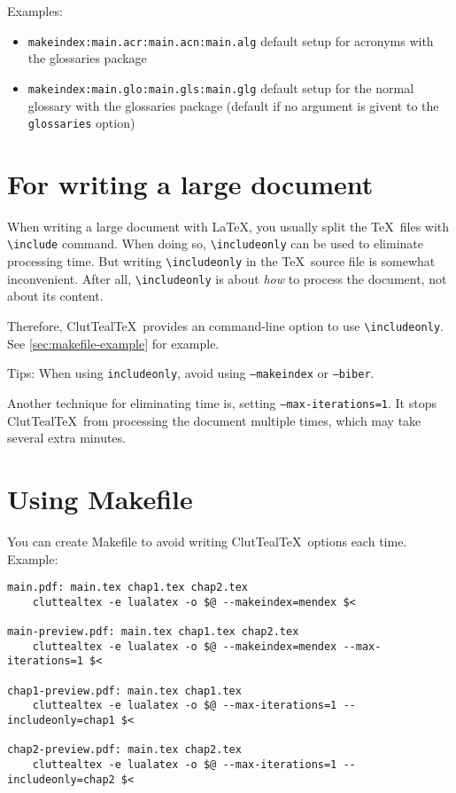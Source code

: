 \documentclass[a4paper]{report}
\newcommand\CluttealTeX{ClutTeal\TeX\xspace}
\newcommand\texcmd[1]{\texttt{\textbackslash #1}}
\begin{document}
Examples:
\begin{itemize}
	\item  \texttt{makeindex:main.acr:main.acn:main.alg}
		\newline
		default setup for
		acronyms with the glossaries package
	\item \texttt{makeindex:main.glo:main.gls:main.glg}
		\newline
		default setup for the
		normal glossary with the glossaries package
		\newline
		(default if no argument is givent to the \texttt{glossaries} option)
\end{itemize}

\section{For writing a large document}
When writing a large document with \LaTeX, you usually split the \TeX\ files with \texcmd{include} command.
When doing so, \texcmd{includeonly} can be used to eliminate processing time.
But writing \texcmd{includeonly} in the \TeX\ source file is somewhat inconvenient.
After all, \texcmd{includeonly} is about \emph{how} to process the document, not about its content.

Therefore, \CluttealTeX\ provides an command-line option to use \texcmd{includeonly}.
See \autoref{sec:makefile-example} for example.

Tips: When using \texttt{includeonly}, avoid using \texttt{--makeindex} or \texttt{--biber}.

Another technique for eliminating time is, setting \texttt{--max-iterations=1}.
It stops \CluttealTeX\ from processing the document multiple times, which may take several extra minutes.

\section{Using Makefile}\label{sec:makefile-example}
You can create Makefile to avoid writing \CluttealTeX\ options each time.
Example:
\begin{verbatim}
main.pdf: main.tex chap1.tex chap2.tex
    cluttealtex -e lualatex -o $@ --makeindex=mendex $<

main-preview.pdf: main.tex chap1.tex chap2.tex
    cluttealtex -e lualatex -o $@ --makeindex=mendex --max-iterations=1 $<

chap1-preview.pdf: main.tex chap1.tex
    cluttealtex -e lualatex -o $@ --max-iterations=1 --includeonly=chap1 $<

chap2-preview.pdf: main.tex chap2.tex
    cluttealtex -e lualatex -o $@ --max-iterations=1 --includeonly=chap2 $<
\end{verbatim}
\end{document}
